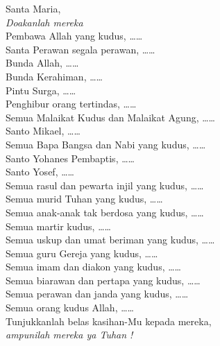 \documentclass[12pt,a4paper]{article}
\begin{document}
Santa Maria, \\
\textit{\hspace*{5mm}Doakanlah mereka}\\
Pembawa Allah yang kudus, \ldots\ldots\\
Santa Perawan segala perawan, \ldots\ldots\\
Bunda Allah, \ldots\ldots\\
Bunda Kerahiman, \ldots\ldots\\
Pintu Surga, \ldots\ldots\\
Penghibur orang tertindas, \ldots\ldots\\
Semua Malaikat Kudus dan Malaikat Agung, \ldots\ldots\\
Santo Mikael, \ldots\ldots\\
Semua Bapa Bangsa dan Nabi yang kudus, \ldots\ldots\\
Santo Yohanes Pembaptis, \ldots\ldots\\
Santo Yosef, \ldots\ldots\\
Semua rasul dan pewarta injil yang kudus, \ldots\ldots\\
Semua murid Tuhan yang kudus, \ldots\ldots\\
Semua anak-anak tak berdosa yang kudus, \ldots\ldots\\
Semua martir kudus, \ldots\ldots\\
Semua uskup dan umat beriman yang kudus, \ldots\ldots\\
Semua guru Gereja yang kudus, \ldots\ldots\\
Semua imam dan diakon yang kudus, \ldots\ldots\\
Semua biarawan dan pertapa yang kudus, \ldots\ldots\\
Semua perawan dan janda yang kudus, \ldots\ldots\\
Semua orang kudus Allah, \ldots\ldots\\

Tunjukkanlah belas kasihan-Mu kepada mereka,\\
\textit{\hspace*{5mm}ampunilah mereka ya Tuhan !}\\
\end{document}
